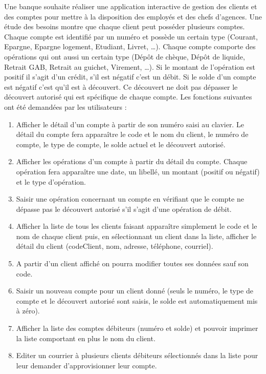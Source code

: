 \documentclass[12pt]{article}
\begin{document}
Une banque souhaite réaliser une application interactive de gestion des clients
et des comptes pour mettre à la disposition des employés et des chefs d'agences.
Une étude des besoins montre que chaque client peut posséder plusieurs comptes.
Chaque compte est  identifié par un numéro et possède un certain type
(Courant, Epargne, Epargne logement, Etudiant, Livret, \ldots).
Chaque compte comporte des opérations qui ont aussi un certain type
(Dépôt de chèque, Dépôt de liquide, Retrait GAB, Retrait au guichet, Virement,
\ldots). Si le montant de l'opération est positif il s'agit d'un crédit, s'il
est négatif c'est un débit.
Si le solde d'un compte est négatif c'est qu'il est à découvert. Ce découvert
ne doit pas dépasser le découvert autorisé qui est spécifique de chaque compte.
Les fonctions suivantes ont été demandées par les utilisateurs :
\begin{enumerate}
\item Afficher le détail d'un compte à partir de son numéro saisi au clavier. Le détail du compte fera apparaître le code et le nom du client, le numéro de compte, le type de compte, le solde actuel et le découvert autorisé.
\item Afficher les opérations d'un compte à partir du détail du compte. Chaque opération fera apparaître une date, un libellé, un montant (positif ou négatif) et le type d'opération.
\item Saisir une opération concernant un compte en vérifiant que le compte ne dépasse pas le découvert autorisé s'il s'agit d'une opération de débit.
\item Afficher la liste de tous les clients faisant apparaître simplement le code et le nom de chaque client puis, en sélectionnant un client dans la liste, afficher le détail du client (codeClient, nom, adresse, téléphone, courriel).
\item A partir d'un client affiché on pourra modifier toutes ses données sauf son code.
\item Saisir un nouveau compte pour un client donné (seuls le numéro, le type de compte et le découvert autorisé sont saisis, le solde est automatiquement mis à zéro).
\item Afficher la liste des comptes débiteurs (numéro et solde) et pouvoir imprimer la liste comportant en plus le nom du client.
\item Editer un courrier à plusieurs clients débiteurs sélectionnés dans la liste pour leur demander d'approvisionner leur compte.
\end{enumerate}
\end{document}
